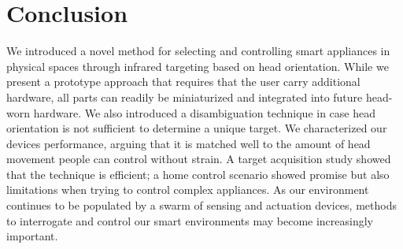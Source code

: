 \section{Conclusion}
We introduced a novel method for selecting and controlling smart appliances in physical spaces through  infrared targeting based on head orientation. While we present a prototype approach that requires that the user carry additional hardware, all parts can readily be miniaturized and integrated into future head-worn hardware. We also introduced a disambiguation technique in case head orientation is not sufficient to determine a unique target. We characterized our devices performance, arguing that it is matched well to the amount of head movement people can control without strain. A target acquisition study showed that the technique is efficient; a home control scenario showed promise but also limitations when trying to control complex appliances. As our environment continues to be populated by a swarm of sensing and actuation devices, methods to interrogate and control our smart environments may become increasingly important.
